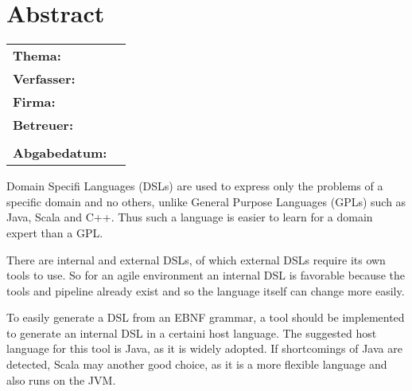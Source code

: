 \documentclass[../InterneDSLs.tex]{subfiles}
\begin{document}
\chapter*{Abstract}

\begin{center}
	\begin{tabular}{ll}
		\textbf{Thema:} 		& \topic\\
		\textbf{Verfasser:} 	& \authorName\\
		\textbf{Firma:} 		& \companyName\\
		\textbf{Betreuer:}		& \proffessor\\
								& \carer\\
		\textbf{Abgabedatum:}	& \closingdate\\
	\end{tabular}
\end{center}

\bigskip
Domain Specifi Languages (DSLs) are used to express only the problems of a specific domain and no others, unlike General Purpose Languages (GPLs) such as Java, Scala and C++. Thus such a language is easier to learn for a domain expert than a GPL.

There are internal and external DSLs, of which external DSLs require its own tools to use. So for an agile environment an internal DSL is favorable because the tools and pipeline already exist and so the language itself can change more easily.

To easily generate a DSL from an EBNF grammar, a tool should be implemented to generate an internal DSL in a certaini host language. The suggested host language for this tool is Java, as it is widely adopted. If shortcomings of Java are detected, Scala may another good choice, as it is a more flexible language and also runs on the JVM.
\newpage
\end{document}
